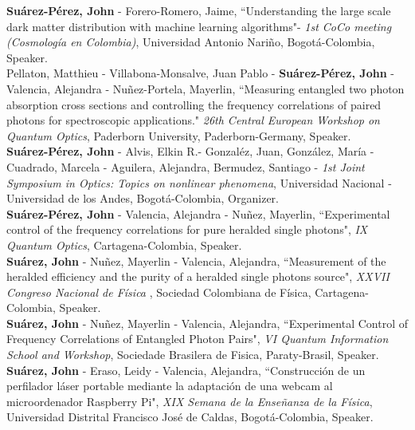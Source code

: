 \documentclass[10pt, a4paper]{article}
\newcommand{\years}[1]{\marginnote{\scriptsize #1}}
\begin{document}
\years{2019}\textbf{Suárez-Pérez, John} - Forero-Romero, Jaime, “Understanding the large scale dark matter distribution with machine learning
algorithms"- \emph{1st CoCo meeting (Cosmología en Colombia)}, Universidad Antonio Nariño, Bogotá-Colombia, Speaker.\\

\years{2019}Pellaton, Matthieu - Villabona-Monsalve, Juan Pablo - \textbf{Suárez-Pérez, John} - Valencia, Alejandra - Nuñez-Portela, Mayerlin, “Measuring entangled two photon absorption cross sections and controlling the frequency correlations of paired photons for spectroscopic applications." \emph{26th Central European Workshop on Quantum Optics}, Paderborn University, Paderborn-Germany, Speaker.\\

\years{2018}\textbf{Suárez-Pérez, John} - Alvis, Elkin R.- Gonzaléz, Juan, González, María - Cuadrado, Marcela - Aguilera, Alejandra, Bermudez, Santiago - \emph{1st Joint Symposium in Optics: Topics on nonlinear phenomena}, Universidad Nacional - Universidad de los Andes, Bogotá-Colombia, Organizer.\\

\years{2018}\textbf{Suárez-Pérez, John} - Valencia, Alejandra - Nuñez, Mayerlin, “Experimental control of the frequency correlations for pure heralded single photons", \emph{IX Quantum Optics}, Cartagena-Colombia, Speaker.\\

\years{2017}\textbf{Suárez, John} - Nuñez, Mayerlin - Valencia, Alejandra, “Measurement of the heralded efficiency and the purity of a heralded single photons source", \emph{XXVII Congreso Nacional de Física} , Sociedad Colombiana de Física, Cartagena-Colombia, Speaker.\\

\years{2017}\textbf{Suárez, John} - Nuñez, Mayerlin - Valencia, Alejandra, “Experimental Control of Frequency Correlations of Entangled Photon Pairs", \emph{VI Quantum Information School and Workshop}, Sociedade Brasilera de Fisica, Paraty-Brasil, Speaker.\\

\years{2016}\textbf{Suárez, John} - Eraso, Leidy - Valencia, Alejandra, “Construcción de un perfilador láser portable mediante la adaptación de una webcam al microordenador Raspberry Pi", \emph{XIX Semana de la Enseñanza de la Física}, Universidad Distrital Francisco José de Caldas, Bogotá-Colombia, Speaker.\\
\end{document}
